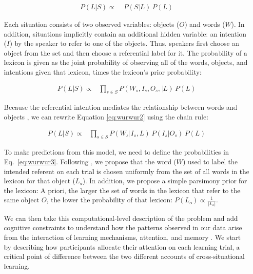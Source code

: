 \documentclass[authoryear,review]{elsarticle}
\begin{document}
\begin{align} 
P(L|S) \propto & \;P(S|L) \: P(L) \label{eq:wurwur1}
\end{align}

\noindent Each situation consists of two observed variables: objects ($O$) and words ($W$). In addition, situations implicitly contain an additional hidden variable: an intention ($I$) by the speaker to refer to one of the objects. Thus, speakers first choose an object from the set and then choose a referential label for it. The probability of a lexicon is given as the joint probability of observing all of the words, objects, and intentions given that lexicon, times the lexicon's prior probability:

\begin{align}
P(L|S) \propto & \prod\limits_{s\in{S}}P(W_{s},I_{s}, O_{s},|L) \: P(L) \label{eq:wurwur2}
\end{align}

\noindent Because the referential intention mediates the relationship between words and objects \citep{Frank2009a}, we can rewrite Equation \ref{eq:wurwur2} using the chain rule:

\begin{align}
P(L|S) \propto & \prod\limits_{s\in{S}}P(W_{s}| I_{s}, L) \: P(I_{s}|O_{s})  \: P(L) \label{eq:wurwur3}
\end{align}

To make predictions from this model, we need to define the probabilities in Eq.~\ref{eq:wurwur3}. Following \citet{Frank2009a}, we propose that the word ($W$) used to label the intended referent on each trial is chosen uniformly from the set of all words in the lexicon for that object ($L_{o}$). In addition, we propose a simple parsimony prior for the lexicon: A priori, the larger the set of words in the lexicon that refer to the same object $O$, the lower the probability of that lexicon: $P(L_{o}) \propto \frac{1}{|L_{o}|}$. 

We can then take this computational-level description of the problem and add cognitive constraints to understand how the patterns observed in our data arise from the interaction of learning mechanisms, attention, and memory \citep[see e.g.,][]{Frank2010a, Shi2010}. We start by describing how participants allocate their attention on each learning trial, a critical point of difference between the two different accounts of cross-situational learning. 
\end{document}
